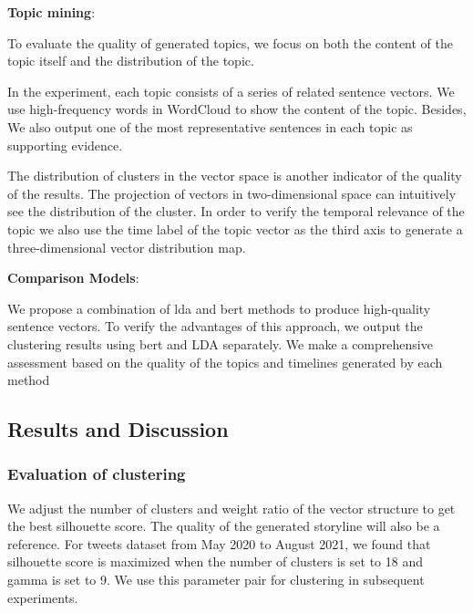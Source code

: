 {\bf Topic mining}:

To evaluate the quality of generated topics, we focus on both the content of the topic itself and the distribution of the topic. 


In the experiment, each topic consists of a series of related sentence vectors. We use high-frequency words in WordCloud to show the content of the topic. Besides, We also output one of the most representative sentences in each topic as supporting evidence. 

The distribution of clusters in the vector space is another indicator of the quality of the results. The projection of vectors in two-dimensional space can intuitively see the distribution of the cluster. In order to verify the temporal relevance of the topic we also use the time label of the topic vector as the third axis to generate a three-dimensional vector distribution map.

{\bf Comparison Models}: 

We propose a combination of lda and bert methods to produce high-quality sentence vectors. To verify the advantages of this approach, we output the clustering results using bert and LDA separately. We make a comprehensive assessment based on the quality of the topics and timelines generated by each method
\subsection{Results and Discussion}
\subsubsection{Evaluation of clustering}

 We adjust the number of clusters and weight ratio of the vector structure to get the best silhouette score. The quality of the generated storyline will also be a reference. For tweets dataset from May 2020 to August 2021, we found that silhouette score is maximized when the number of clusters is set to 18 and gamma is set to 9. We use this parameter pair for clustering in subsequent experiments.



